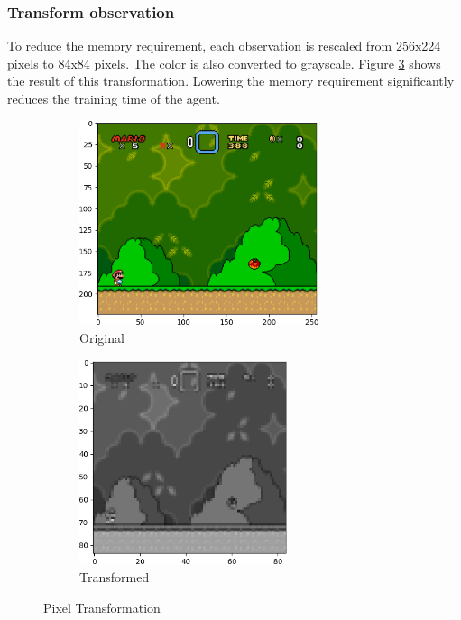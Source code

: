 \documentclass{article}
\begin{document}
\subsubsection{Transform observation}
To reduce the memory requirement, each observation is rescaled from 256x224 pixels to 84x84 pixels.
The color is also converted to grayscale.
Figure \ref{fig:transformation} shows the result of this transformation.
Lowering the memory requirement significantly reduces the training time of the agent.
\begin{figure}[ht]
    \centering
    \begin{subfigure}{.5\textwidth}
        \centering
        \includegraphics[height=6cm]{original_crop}
        \caption{Original}
        \label{fig:sub1}
    \end{subfigure}%
    \begin{subfigure}{.5\textwidth}
        \centering
        \includegraphics[height=6cm]{grayscale_crop}
        \caption{Transformed}
        \label{fig:sub2}
    \end{subfigure}
    \caption{Pixel Transformation}
    \label{fig:transformation}
\end{figure}
\end{document}
